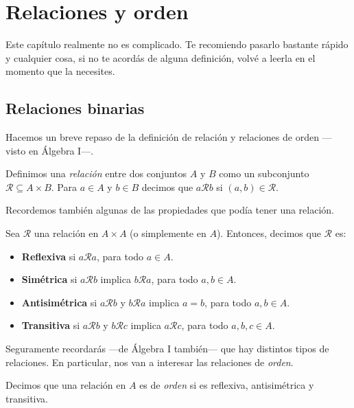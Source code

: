 \chapter{Relaciones y orden}

Este capítulo realmente no es complicado. Te recomiendo pasarlo bastante rápido y cualquier cosa, si no te acordás de alguna definición, volvé a leerla en el momento que la necesites.

\section{Relaciones binarias}

Hacemos un breve repaso de la definición de relación y relaciones de orden ---visto en Álgebra I---.

\begin{definition}
	Definimos una \emph{relación} entre dos conjuntos $A$ y $B$ como un subconjunto $\mathcal{R} \subseteq A \times B$. Para $a \in A$ y $b \in B$ decimos que $a \mathcal{R} b$ si $(a, b) \in \mathcal{R}$.
\end{definition}

Recordemos también algunas de las propiedades que podía tener una relación.

\begin{definition}
	Sea $\mathcal{R}$ una relación en $A \times A$ (o simplemente en $A$). Entonces, decimos que $\mathcal{R}$ es:
	\begin{itemize}
		\item \textbf{Reflexiva} si $a \mathcal{R} a$, para todo $a \in A$.
		\item \textbf{Simétrica} si $a \mathcal{R} b$ implica $b \mathcal{R} a$, para todo $a, b \in A$.
		\item \textbf{Antisimétrica} si $a \mathcal{R} b$ y $b \mathcal{R} a$ implica $a = b$, para todo $a, b \in A$.
		\item \textbf{Transitiva} si $a \mathcal{R} b$ y $b \mathcal{R} c$ implica $a \mathcal{R} c$, para todo $a, b, c \in A$.
	\end{itemize}
\end{definition}

Seguramente recordarás ---de Álgebra I también--- que hay distintos tipos de relaciones. En particular, nos van a interesar las relaciones de \textit{orden}.

\begin{definition}
	Decimos que una relación en $A$ es de \emph{orden} si es reflexiva, antisimétrica y transitiva.
\end{definition}

